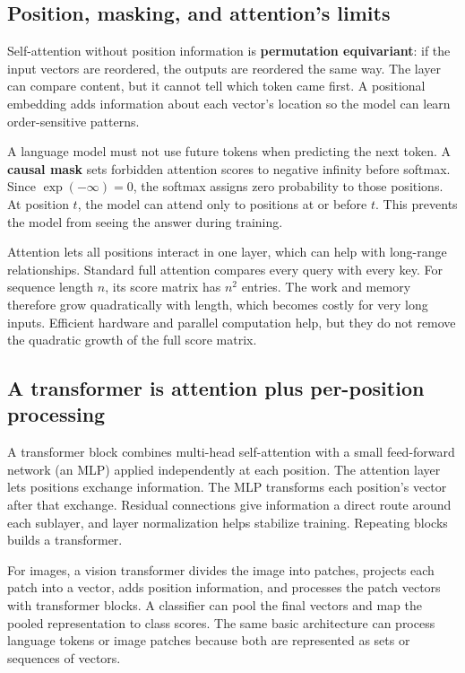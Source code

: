 \subsection{Position, masking, and attention's limits}\label{04-visual-computing-ii-ch031-position-masking-and-attentions-limits}

Self-attention without position information is \textbf{permutation equivariant}: if the input vectors are reordered, the outputs are reordered the same way. The layer can compare content, but it cannot tell which token came first. A positional embedding adds information about each vector's location so the model can learn order-sensitive patterns.

A language model must not use future tokens when predicting the next token. A \textbf{causal mask} sets forbidden attention scores to negative infinity before softmax. Since \(\exp(-\infty)=0\), the softmax assigns zero probability to those positions. At position \(t\), the model can attend only to positions at or before \(t\). This prevents the model from seeing the answer during training.

Attention lets all positions interact in one layer, which can help with long-range relationships. Standard full attention compares every query with every key. For sequence length \(n\), its score matrix has \(n^2\) entries. The work and memory therefore grow quadratically with length, which becomes costly for very long inputs. Efficient hardware and parallel computation help, but they do not remove the quadratic growth of the full score matrix.

\subsection{A transformer is attention plus per-position processing}\label{04-visual-computing-ii-ch031-a-transformer-is-attention-plus-per-position-processing}

A transformer block combines multi-head self-attention with a small feed-forward network (an MLP) applied independently at each position. The attention layer lets positions exchange information. The MLP transforms each position's vector after that exchange. Residual connections give information a direct route around each sublayer, and layer normalization helps stabilize training. Repeating blocks builds a transformer.

For images, a vision transformer divides the image into patches, projects each patch into a vector, adds position information, and processes the patch vectors with transformer blocks. A classifier can pool the final vectors and map the pooled representation to class scores. The same basic architecture can process language tokens or image patches because both are represented as sets or sequences of vectors.


